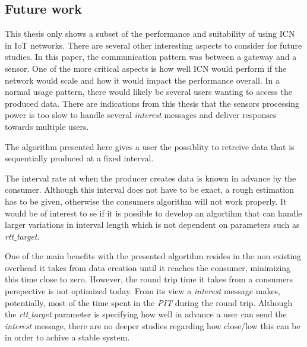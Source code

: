 \subsection{Future work}
This thesis only shows a subset of the performance and suitability of using ICN in IoT networks. There are several other interesting aspects to consider for future studies. 
In this paper, the communication pattern was between a gateway and a sensor. One of the more critical aspects is how well ICN would perform if the network would scale and how it would impact the performance overall. 
In a normal usage pattern, there would likely be several users wanting to access the produced data. There are indications from this thesis that the sensors processing power is too slow to handle several \textit{interest} messages and deliver responses towards multiple users.

The algorithm presented here gives a user the possiblity to retreive data that is sequentially produced at a fixed interval.

The interval rate at when the producer creates data is known in advance by the consumer. Although this interval does not have to be exact, a rough estimation has to be given, otherwise the consumers algorithm will not work properly. %
It would be of interest to se if it is possible to develop an algortihm that can handle larger variations in interval length which is not dependent on parameters such as \textit{rtt$\_$target}.

One of the main benefits with the presented algortihm resides in the non existing overhead it takes from data creation until it reaches the consumer, minimizing this time close to zero. However, the round trip time it takes from a consumers perspective is not optimized today. From its view a \textit{interest} message makes, potentially, most of the time spent in the \textit{PIT} during the round trip.
Although the \textit{rtt$\_$target} parameter is specifying how well in advance a user can send the \textit{interest} message, there are no deeper studies regarding how close/low this can be in order to achive a stable system. 

